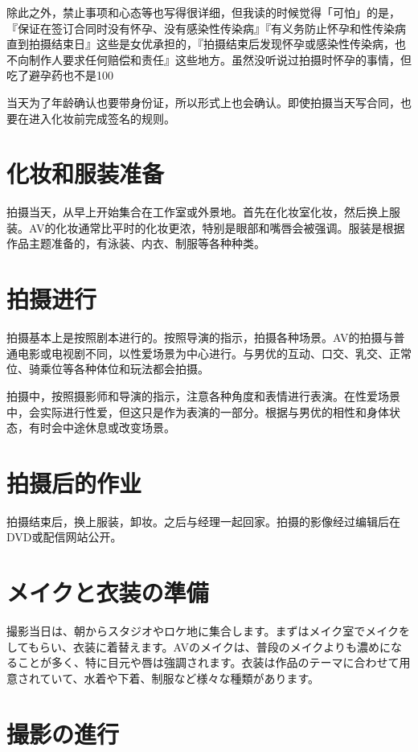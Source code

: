 \documentclass[12pt,UTF8]{ctexbook}
\begin{document}
除此之外，禁止事项和心态等也写得很详细，但我读的时候觉得「可怕」的是，『保证在签订合同时没有怀孕、没有感染性传染病』『有义务防止怀孕和性传染病直到拍摄结束日』这些是女优承担的，『拍摄结束后发现怀孕或感染性传染病，也不向制作人要求任何赔偿和责任』这些地方。虽然没听说过拍摄时怀孕的事情，但吃了避孕药也不是100%

当天为了年龄确认也要带身份证，所以形式上也会确认。即使拍摄当天写合同，也要在进入化妆前完成签名的规则。

\section{化妆和服装准备}

拍摄当天，从早上开始集合在工作室或外景地。首先在化妆室化妆，然后换上服装。AV的化妆通常比平时的化妆更浓，特别是眼部和嘴唇会被强调。服装是根据作品主题准备的，有泳装、内衣、制服等各种种类。

\section{拍摄进行}

拍摄基本上是按照剧本进行的。按照导演的指示，拍摄各种场景。AV的拍摄与普通电影或电视剧不同，以性爱场景为中心进行。与男优的互动、口交、乳交、正常位、骑乘位等各种体位和玩法都会拍摄。

拍摄中，按照摄影师和导演的指示，注意各种角度和表情进行表演。在性爱场景中，会实际进行性爱，但这只是作为表演的一部分。根据与男优的相性和身体状态，有时会中途休息或改变场景。

\section{拍摄后的作业}

拍摄结束后，换上服装，卸妆。之后与经理一起回家。拍摄的影像经过编辑后在DVD或配信网站公开。

\section{メイクと衣装の準備}

撮影当日は、朝からスタジオやロケ地に集合します。まずはメイク室でメイクをしてもらい、衣装に着替えます。AVのメイクは、普段のメイクよりも濃めになることが多く、特に目元や唇は強調されます。衣装は作品のテーマに合わせて用意されていて、水着や下着、制服など様々な種類があります。

\section{撮影の進行}
\end{document}
